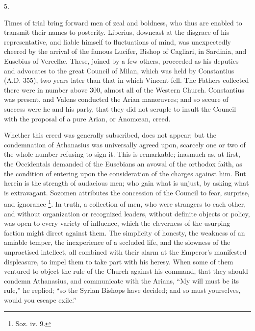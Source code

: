 5.

Times of trial bring forward men of zeal and boldness, who thus are
enabled to transmit their names to posterity. Liberius, downcast at
the disgrace of his representative, and liable himself to fluctuations
of mind, was unexpectedly cheered by the arrival of the famous
Lucifer, Bishop of Cagliari, in Sardinia, and Eusebius of Vercellæ.
These, joined by a few others, proceeded as his deputies and advocates
to the great Council of Milan, which was held by Constantius (A.D.
355), two years later than that in which Vincent fell. The Fathers
collected there were in number above 300, almost all of the Western
Church. Constantius was present, and Valens conducted the Arian manœuvres;
and so secure of success were he and his party, that they did not
scruple to insult the Council with the proposal of a pure Arian, or
Anomœan, creed.

Whether this creed was generally subscribed, does not appear; but
the condemnation of Athanasius was universally agreed upon, scarcely
one or two of the whole number refusing to sign it. This is
remarkable; inasmuch as, at first, the Occidentals demanded of the
Eusebians an avowal of the orthodox faith, as the condition of
entering upon the consideration of the charges against him. But herein
is the strength of audacious men; who gain what is unjust, by asking
what is extravagant. Sozomen attributes the concession of the
Council to fear, surprise, and ignorance \footnote{Soz. iv. 9.}. In truth, a collection of men, who were strangers to each
other, and without organization or recognized leaders, without
definite objects or policy, was open to every variety of influence,
which the cleverness of the usurping faction might direct against
them. The simplicity of honesty, the weakness of an amiable temper,
the inexperience of a secluded life, and the slowness of the
unpractised intellect, all combined with their alarm at the Emperor's
manifested displeasure, to impel them to take part with his heresy.
When some of them ventured to object the rule of the Church against
his command, that they should condemn Athanasius, and communicate with
the Arians, ``My will must be its rule,'' he replied; ``so
the Syrian Bishops have decided; and so must yourselves, would you
escape exile.''

